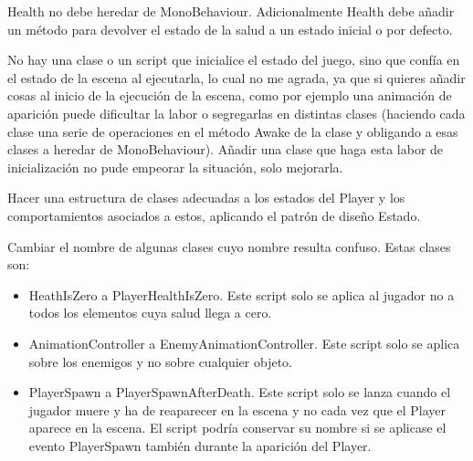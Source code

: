 Health no debe heredar de MonoBehaviour. Adicionalmente Health debe añadir un método para devolver el estado de la salud a un estado inicial o por defecto. 

No hay una clase o un script que inicialice el estado del juego, sino que confía en el estado de la escena al ejecutarla, lo cual no me agrada, ya que si quieres añadir cosas al inicio de la ejecución de la escena, como por ejemplo una animación de aparición puede dificultar la labor o segregarlas en distintas clases (haciendo cada clase una serie de operaciones en el método Awake de la clase y obligando a esas clases a heredar de MonoBehaviour). Añadir una clase que haga esta labor de inicialización no pude empeorar la situación, solo mejorarla. 

Hacer una estructura de clases adecuadas a los estados del Player y los comportamientos asociados a estos, aplicando el patrón de diseño Estado. 

Cambiar el nombre de algunas clases cuyo nombre resulta confuso. Estas clases son: 
\begin{itemize}
\item
HeathIsZero a PlayerHealthIsZero. Este script solo se aplica al jugador no a todos los elementos cuya salud llega a cero. 
\item
AnimationController a EnemyAnimationController. Este script solo se aplica sobre los enemigos y no sobre cualquier objeto. 
\item
PlayerSpawn a PlayerSpawnAfterDeath. Este script solo se lanza cuando el jugador muere y ha de reaparecer en la escena y no cada vez que el Player aparece en la escena. El script podría conservar su nombre si se aplicase el evento PlayerSpawn también durante la aparición del Player.
\end{itemize}

